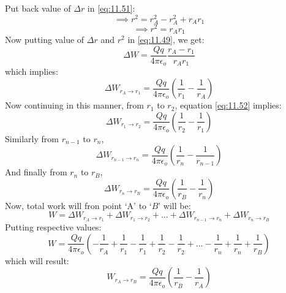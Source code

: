 Put back value of $\Delta r$ in \ref{eq:11.51}:
\begin{equation}
  \implies r^{2} = r_{A}^{2} - r_{A}^{2} + r_{A}r_{1} \nonumber 
\end{equation}
\begin{equation}
  \implies r^{2} = r_{A}r_{1} \nonumber
\end{equation}
Now putting value of $\Delta r$ and $r^{2}$ in \ref{eq:11.49}, we get:
\begin{equation}
  \Delta W = \frac{Qq}{4\pi\epsilon_{o} } \frac{r_{A} - r_{1}}{r_{A}r_{1}} \nonumber
\end{equation}
which implies:
\begin{equation}\label{eq:11.52}
  \Delta W_{r_{A}\rightarrow r_{1}} = \frac{Qq}{4\pi\epsilon_{o} } (\frac{1}{r_{1}} - \frac{1}{r_{A}})
\end{equation}
Now continuing in this manner, from $r_{1}$ to $r_{2}$, equation
\ref{eq:11.52} implies:
\begin{equation}\label{eq:11.53}
  \Delta W_{r_{1}\rightarrow r_{2}} = \frac{Qq}{4\pi\epsilon_{o} } (\frac{1}{r_{2}} - \frac{1}{r_{1}})
\end{equation}
Similarly from $r_{n-1}$ to $r_{n}$, 
\begin{equation}\label{eq:11.54}
  \Delta W_{r_{n-1}\rightarrow r_{n}} = \frac{Qq}{4\pi\epsilon_{o} } (\frac{1}{r_{n}} - \frac{1}{r_{n-1}})
\end{equation}
And finally from $r_{n}$ to $r_{B}$, 
\begin{equation}\label{eq:11.55}
  \Delta W_{r_{n}\rightarrow r_{B}} = \frac{Qq}{4\pi\epsilon_{o} } (\frac{1}{r_{B}} - \frac{1}{r_{n}})
\end{equation}
Now, total work will fron point `A' to `$B$' will be:
\begin{equation}\nonumber
  W = \Delta W_{r_{A}\rightarrow r_{1}} +
  \Delta W_{r_{1}\rightarrow r_{2}} + 
  ... + \Delta W_{r_{n-1}\rightarrow r_{n}} + \Delta W_{r_{n}\rightarrow r_{B}} 
\end{equation}
Putting respective values:
\begin{equation}
  W = \frac{Qq}{4\pi\epsilon_{o} } (-\frac{1}{r_{A}} +
  \frac{1}{r_{1}} -
  \frac{1}{r_{1}} +
  \frac{1}{r_{2}}-
  \frac{1}{r_{2}}+
  ...-
  \frac{1}{r_{n}}+
  \frac{1}{r_{n}}+
  \frac{1}{r_{B}}
  )\nonumber
\end{equation}
which will result:
\begin{equation}\label{eq:11.56}
   W_{r_{A}\rightarrow r_{B}} = \frac{Qq}{4\pi\epsilon_{o} } (\frac{1}{r_{B}} - \frac{1}{r_{A}})
\end{equation}
